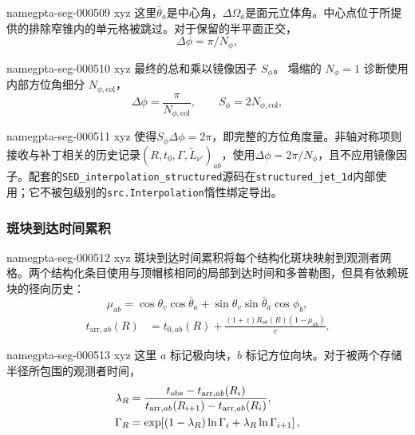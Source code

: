 \documentclass[twocolumn]{aastex702}
\makeatletter
\providecommand{\gptareaderanchor}[1]{\pdfdest name{#1} xyz}%
\providecommand{\gptareaderanchor}[1]{\special{pdf:dest (#1) [ @thispage /XYZ @xpos @ypos null ]}}%
\makeatother
\begin{document}
\gptareaderanchor{gpta-seg-000509}%
这里\(\bar\theta_a\)是中心角，\(\Delta\Omega_a\)是面元立体角。中心点位于所提供的排除窄锥内的单元格被跳过。对于保留的半平面正交，
\begin{equation}
\Delta\phi=\pi/N_\phi ,
\end{equation}

\gptareaderanchor{gpta-seg-000510}%
最终的总和乘以镜像因子 \(S_\phi\)。 塌缩的 \(N_\phi=1\) 诊断使用内部方位角细分 \(N_{\phi,\mathrm{col}}\)，
\begin{equation}
\Delta\phi=\frac{\pi}{N_{\phi,\mathrm{col}}},\qquad
S_\phi=2N_{\phi,\mathrm{col}},
\end{equation}

\gptareaderanchor{gpta-seg-000511}%
使得\(S_\phi\Delta\phi=2\pi\)，即完整的方位角度量。非轴对称项则接收与补丁相关的历史记录\((R,t_0,\Gamma,\widetilde L_{\nu'})_{ab}\)，使用\(\Delta\phi=2\pi/N_\phi\)，且不应用镜像因子。配套的\texttt{SED\_interpolation\_structured}源码在\texttt{structured\_jet\_1d}内部使用；它不被包级别的\texttt{src.Interpolation}惰性绑定导出。

\subsubsection{斑块到达时间累积}


\gptareaderanchor{gpta-seg-000512}%
斑块到达时间累积将每个结构化斑块映射到观测者网格。两个结构化条目使用与顶帽核相同的局部到达时间和多普勒图，但具有依赖斑块的径向历史：
\begin{equation}
\mu_{ab}=
\cos\theta_v\cos\bar\theta_a
+\sin\theta_v\sin\bar\theta_a\cos\phi_b,
\end{equation}
\begin{equation}
\begin{aligned}
t_{\mathrm{arr},ab}(R)&=t_{0,ab}(R)
+\frac{(1+z)R_{ab}(R)(1-\mu_{ab})}{c}.
\end{aligned}
\end{equation}

\gptareaderanchor{gpta-seg-000513}%
这里 \(a\) 标记极向块，\(b\) 标记方位向块。对于被两个存储半径所包围的观测者时间，
\begin{equation}
\begin{aligned}
\lambda_R&=\frac{t_{\rm obs}-t_{\mathrm{arr},ab}(R_i)}
{t_{\mathrm{arr},ab}(R_{i+1})-t_{\mathrm{arr},ab}(R_i)},\\
\Gamma_R&=\exp\!\left[(1-\lambda_R)\ln\Gamma_i
+\lambda_R\ln\Gamma_{i+1}\right],
\end{aligned}
\end{equation}
\end{document}
